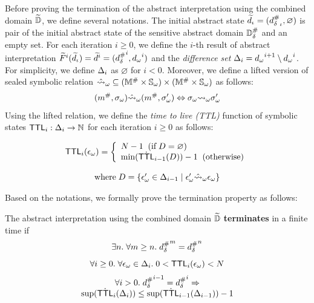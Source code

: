 Before proving the termination of the abstract interpretation using the combined
domain $\widetilde{\mathbb{D}}$, we define several notations. The initial abstract state
$\widetilde{d}_\iota = ({{d}^{\#}_\delta}_\iota, \varnothing)$ is pair of the initial abstract state of
the sensitive abstract domain ${\mathbb{D}}^{\#}_\delta$ and an empty set. For each iteration $i
\geq 0$, we define the $i$-th result of abstract interpretation
$\widetilde{F}^i(\widetilde{d}_\iota) = \widetilde{d}^i = ({{d}^{\#}_\delta}^i, {{d}_\omega}^i)$ and the
\textit{difference set} $\Delta_i = {{d}_\omega}^{i+1} \setminus {{d}_\omega}^i$.
For simplicity, we define $\Delta_i$ as $\varnothing$ for $i < 0$.  Moreover, we
define a lifted version of sealed symbolic relation $\hat{\leadsto}_\omega \subseteq
({\mathbb{M}}^{\#} \times {\mathbb{S}}_\omega) \times ({\mathbb{M}}^{\#} \times {\mathbb{S}}_\omega)$ as
follows:
\[
  ({m}^{\#}, {\sigma}_\omega) \hat{\leadsto}_\omega ({m}^{\#}, {\sigma}_\omega') \Leftrightarrow
  {\sigma}_\omega {\leadsto}_\omega {\sigma}_\omega'
\]
Using the lifted relation, we define the \textit{time to live (TTL)} function of
symbolic states $\textsf{TTL}_i: \Delta_i \rightarrow \mathbb{N}$ for each iteration $i
\geq 0$ as follows:
\begin{definition}
  \[
    \begin{array}{c}
      \textsf{TTL}_i({\epsilon}_\omega) = \left \{
      \begin{array}{l}
        N - 1 \;\; ( \text{if} \; D = \varnothing)\\
        \text{min}(\dot{\textsf{TTL}}_{i-1}(D)) - 1
        \;\; ( \text{otherwise})
      \end{array}
      \right. \\
      \\
      \text{where} \; D =
      \{{\epsilon}_\omega' \in \Delta_{i-1} \mid {\epsilon}_\omega' \hat{\leadsto}_\omega {\epsilon}_\omega\}
    \end{array}
  \]
\end{definition}

Based on the notations, we formally prove the termination property as follows:
\begin{theorem}[Termination]\label{theorem:termination}
  The abstract interpretation using the combined domain $\widetilde{\mathbb{D}}$
  \textbf{terminates} in a finite time if
  \begin{equation}\label{equ:termination-sai}
    \exists n. \; \forall m \geq n. \; {{d}^{\#}_\delta}^m = {{d}^{\#}_\delta}^n
  \end{equation}
  \begin{equation}\label{equ:bounded-ttl}
    \forall i \geq 0. \; \forall {\epsilon}_\omega \in \Delta_i. \;
    0 < \textsf{TTL}_i({\epsilon}_\omega) < N
  \end{equation}
  \begin{equation}\label{equ:dec-ttl}
    \begin{array}{c}
      \forall i > 0. \; {{d}^{\#}_\delta}^{i-1} = {{d}^{\#}_\delta}^i \Rightarrow\\
      \sup(\dot {\textsf{TTL}}_i(\Delta_i)) \leq \sup(\dot {\textsf{TTL}}_{i-1}(\Delta_{i-1})) - 1
    \end{array}
  \end{equation}
\end{theorem}

